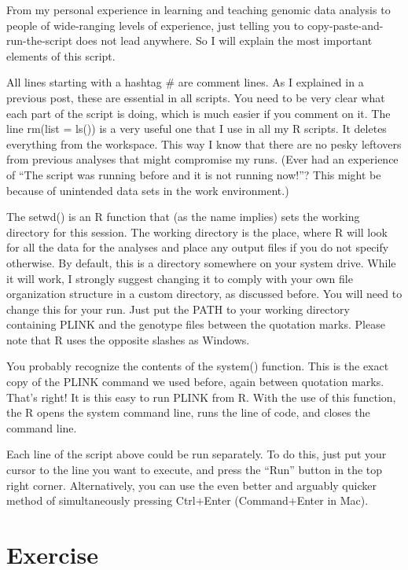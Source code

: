 \documentclass[]{book}
\begin{document}
From my personal experience in learning and teaching genomic data
analysis to people of wide-ranging levels of experience, just telling
you to copy-paste-and-run-the-script does not lead anywhere. So I will
explain the most important elements of this script.

All lines starting with a hashtag \# are comment lines. As I explained
in a previous post, these are essential in all scripts. You need to be
very clear what each part of the script is doing, which is much easier
if you comment on it. The line rm(list = ls()) is a very useful one that
I use in all my R scripts. It deletes everything from the workspace.
This way I know that there are no pesky leftovers from previous analyses
that might compromise my runs. (Ever had an experience of ``The script
was running before and it is not running now!''? This might be because
of unintended data sets in the work environment.)

The setwd() is an R function that (as the name implies) sets the working
directory for this session. The working directory is the place, where R
will look for all the data for the analyses and place any output files
if you do not specify otherwise. By default, this is a directory
somewhere on your system drive. While it will work, I strongly suggest
changing it to comply with your own file organization structure in a
custom directory, as discussed before. You will need to change this for
your run. Just put the PATH to your working directory containing PLINK
and the genotype files between the quotation marks. Please note that R
uses the opposite slashes as Windows.

You probably recognize the contents of the system() function. This is
the exact copy of the PLINK command we used before, again between
quotation marks. That's right! It is this easy to run PLINK from R. With
the use of this function, the R opens the system command line, runs the
line of code, and closes the command line.

Each line of the script above could be run separately. To do this, just
put your cursor to the line you want to execute, and press the ``Run''
button in the top right corner. Alternatively, you can use the even
better and arguably quicker method of simultaneously pressing Ctrl+Enter
(Command+Enter in Mac).

\section{Exercise}\label{exercise-1}
\end{document}
